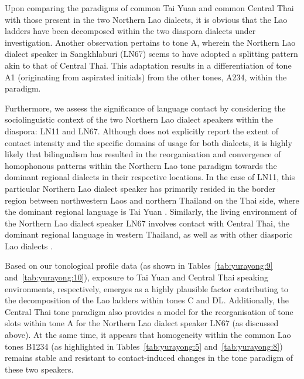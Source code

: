\documentclass[output=paper]{langscibook}
\begin{document}
Upon comparing the paradigms of common Tai Yuan and common Central Thai with those present in the two Northern Lao dialects, it is obvious that the Lao ladders have been decomposed within the two diaspora dialects under investigation. Another observation pertains to tone A, wherein the Northern Lao dialect speaker in Sangkhlaburi (LN67) seems to have adopted a splitting pattern akin to that of Central Thai. This adaptation results in a differentiation of tone A1 (originating from aspirated initials) from the other tones, A234, within the paradigm.

Furthermore, we assess the significance of language contact by considering the sociolinguistic context of the two Northern Lao dialect speakers within the diaspora: LN11 and LN67. Although \citet{Akkharawatthanakun2003} does not explicitly report the extent of contact intensity and the specific domains of usage for both dialects, it is highly likely that bilingualism has resulted in the reorganisation and convergence of homophonous patterns within the Northern Lao tone paradigm towards the dominant regional dialects in their respective locations. In the case of LN11, this particular Northern Lao dialect speaker has primarily resided in the border region between northwestern Laos and northern Thailand on the Thai side, where the dominant regional language is Tai Yuan \citep[150, 450]{Akkharawatthanakun2003}. Similarly, the living environment of the Northern Lao dialect speaker LN67 involves contact with Central Thai, the dominant regional language in western Thailand, as well as with other diasporic Lao dialects \citep[150, 448]{Akkharawatthanakun2003}.

Based on our tonological profile data (as shown in Tables~\ref{tab:yurayong:9} and~\ref{tab:yurayong:10}), exposure to Tai Yuan and Central Thai speaking environments, respectively, emerges as a highly plausible factor contributing to the decomposition of the Lao ladders within tones C and DL. Additionally, the Central Thai tone paradigm also provides a model for the reorganisation of tone slots within tone A for the Northern Lao dialect speaker LN67 (as discussed above). At the same time, it appears that homogeneity within the common Lao tones B1234 (as highlighted in Tables~\ref{tab:yurayong:5} and~\ref{tab:yurayong:8}) remains stable and resistant to contact-induced changes in the tone paradigm of these two speakers.
\end{document}

